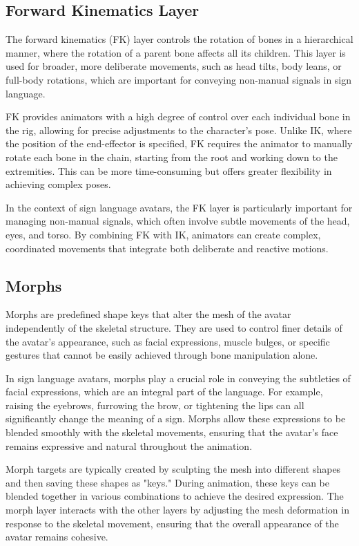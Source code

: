 \documentclass[../../main.tex]{subfiles}
\begin{document}
\subsection{Forward Kinematics Layer}
The forward kinematics (FK) layer controls the rotation of bones in a hierarchical manner, where the rotation of a parent bone affects all its children. This layer is used for broader, more deliberate movements, such as head tilts, body leans, or full-body rotations, which are important for conveying non-manual signals in sign language.

FK provides animators with a high degree of control over each individual bone in the rig, allowing for precise adjustments to the character's pose. Unlike IK, where the position of the end-effector is specified, FK requires the animator to manually rotate each bone in the chain, starting from the root and working down to the extremities. This can be more time-consuming but offers greater flexibility in achieving complex poses.

In the context of sign language avatars, the FK layer is particularly important for managing non-manual signals, which often involve subtle movements of the head, eyes, and torso. By combining FK with IK, animators can create complex, coordinated movements that integrate both deliberate and reactive motions.

\subsection{Morphs}
Morphs are predefined shape keys that alter the mesh of the avatar independently of the skeletal structure. They are used to control finer details of the avatar's appearance, such as facial expressions, muscle bulges, or specific gestures that cannot be easily achieved through bone manipulation alone.

In sign language avatars, morphs play a crucial role in conveying the subtleties of facial expressions, which are an integral part of the language. For example, raising the eyebrows, furrowing the brow, or tightening the lips can all significantly change the meaning of a sign. Morphs allow these expressions to be blended smoothly with the skeletal movements, ensuring that the avatar's face remains expressive and natural throughout the animation.

Morph targets are typically created by sculpting the mesh into different shapes and then saving these shapes as "keys." During animation, these keys can be blended together in various combinations to achieve the desired expression. The morph layer interacts with the other layers by adjusting the mesh deformation in response to the skeletal movement, ensuring that the overall appearance of the avatar remains cohesive.
\end{document}
